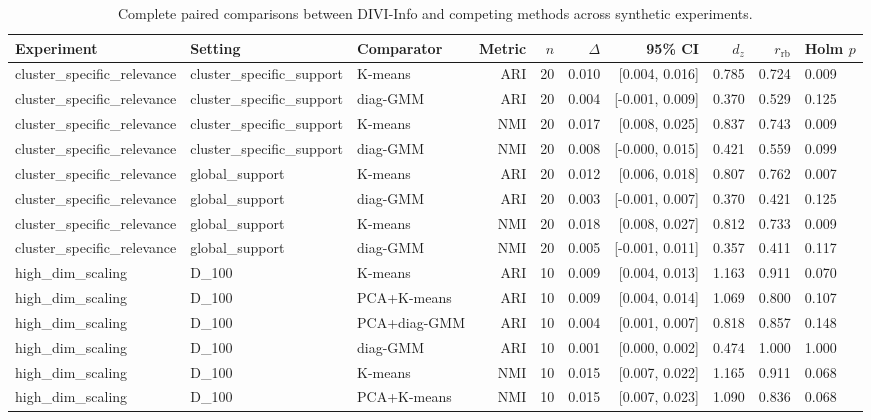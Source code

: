 \begin{table}[t]
\centering
\footnotesize
\caption{Complete paired comparisons between DIVI-Info and competing methods across synthetic experiments.}
\label{tab:paired_tests_appendix}
\begin{tabular}{lllrrrrrr}
\toprule
Experiment & Setting & Comparator & Metric & $n$ & $\Delta$ & 95\% CI & $d_z$ & $r_{\mathrm{rb}}$ & Holm $p$ \\
\midrule
cluster\_specific\_relevance & cluster\_specific\_support & K-means & ARI & 20 & 0.010 & [0.004, 0.016] & 0.785 & 0.724 & 0.009 \\
cluster\_specific\_relevance & cluster\_specific\_support & diag-GMM & ARI & 20 & 0.004 & [-0.001, 0.009] & 0.370 & 0.529 & 0.125 \\
cluster\_specific\_relevance & cluster\_specific\_support & K-means & NMI & 20 & 0.017 & [0.008, 0.025] & 0.837 & 0.743 & 0.009 \\
cluster\_specific\_relevance & cluster\_specific\_support & diag-GMM & NMI & 20 & 0.008 & [-0.000, 0.015] & 0.421 & 0.559 & 0.099 \\
cluster\_specific\_relevance & global\_support & K-means & ARI & 20 & 0.012 & [0.006, 0.018] & 0.807 & 0.762 & 0.007 \\
cluster\_specific\_relevance & global\_support & diag-GMM & ARI & 20 & 0.003 & [-0.001, 0.007] & 0.370 & 0.421 & 0.125 \\
cluster\_specific\_relevance & global\_support & K-means & NMI & 20 & 0.018 & [0.008, 0.027] & 0.812 & 0.733 & 0.009 \\
cluster\_specific\_relevance & global\_support & diag-GMM & NMI & 20 & 0.005 & [-0.001, 0.011] & 0.357 & 0.411 & 0.117 \\
high\_dim\_scaling & D\_100 & K-means & ARI & 10 & 0.009 & [0.004, 0.013] & 1.163 & 0.911 & 0.070 \\
high\_dim\_scaling & D\_100 & PCA+K-means & ARI & 10 & 0.009 & [0.004, 0.014] & 1.069 & 0.800 & 0.107 \\
high\_dim\_scaling & D\_100 & PCA+diag-GMM & ARI & 10 & 0.004 & [0.001, 0.007] & 0.818 & 0.857 & 0.148 \\
high\_dim\_scaling & D\_100 & diag-GMM & ARI & 10 & 0.001 & [0.000, 0.002] & 0.474 & 1.000 & 1.000 \\
high\_dim\_scaling & D\_100 & K-means & NMI & 10 & 0.015 & [0.007, 0.022] & 1.165 & 0.911 & 0.068 \\
high\_dim\_scaling & D\_100 & PCA+K-means & NMI & 10 & 0.015 & [0.007, 0.023] & 1.090 & 0.836 & 0.068 \\

\end{tabular}
\end{table}
